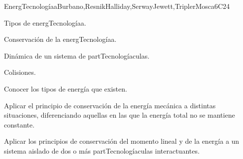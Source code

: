 \begin{syllabus}
\begin{unit}{}{EnergTecnologíaa}{Burbano,ResnikHalliday,SerwayJewett,TriplerMosca}{6}{C24}
\begin{topics}
      \item Tipos de energTecnologíaa.
      \item Conservación de la energTecnologíaa. 
      \item Dinámica de un sistema de partTecnologíaculas.
      \item Colisiones.
  \end{topics}

   \begin{learningoutcomes}
      \item Conocer los tipos de energía que existen.
      \item Aplicar el principio de conservación de la energía mecánica a distintas situaciones, diferenciando aquellas en las que la energía total no se mantiene constante. 
      \item Aplicar los principios de conservación del momento lineal y de la energía a un sistema aislado de dos o más partTecnologíaculas interactuantes.
   \end{learningoutcomes}
\end{unit}



\begin{coursebibliography}
\end{coursebibliography}

\end{syllabus}
